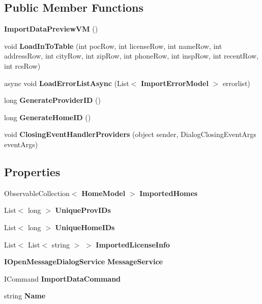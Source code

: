 \subsection*{Public Member Functions}
\begin{DoxyCompactItemize}
\item 
\textbf{ Import\+Data\+Preview\+VM} ()
\item 
void \textbf{ Load\+In\+To\+Table} (int poc\+Row, int license\+Row, int name\+Row, int address\+Row, int city\+Row, int zip\+Row, int phone\+Row, int insp\+Row, int recent\+Row, int rcs\+Row)
\item 
async void \textbf{ Load\+Error\+List\+Async} (List$<$ \textbf{ Import\+Error\+Model} $>$ errorlist)
\item 
long \textbf{ Generate\+Provider\+ID} ()
\item 
long \textbf{ Generate\+Home\+ID} ()
\item 
void \textbf{ Closing\+Event\+Handler\+Providers} (object sender, Dialog\+Closing\+Event\+Args event\+Args)
\end{DoxyCompactItemize}
\subsection*{Properties}
\begin{DoxyCompactItemize}
\item 
Observable\+Collection$<$ \textbf{ Home\+Model} $>$ \textbf{ Imported\+Homes}\hspace{0.3cm}{\ttfamily  [get, set]}
\item 
List$<$ long $>$ \textbf{ Unique\+Prov\+I\+Ds}\hspace{0.3cm}{\ttfamily  [get, set]}
\item 
List$<$ long $>$ \textbf{ Unique\+Home\+I\+Ds}\hspace{0.3cm}{\ttfamily  [get, set]}
\item 
List$<$ List$<$ string $>$ $>$ \textbf{ Imported\+License\+Info}\hspace{0.3cm}{\ttfamily  [get, set]}
\item 
\textbf{ I\+Open\+Message\+Dialog\+Service} \textbf{ Message\+Service}\hspace{0.3cm}{\ttfamily  [get]}
\item 
I\+Command \textbf{ Import\+Data\+Command}\hspace{0.3cm}{\ttfamily  [get]}
\item 
string \textbf{ Name}\hspace{0.3cm}{\ttfamily  [get]}
\end{DoxyCompactItemize}
